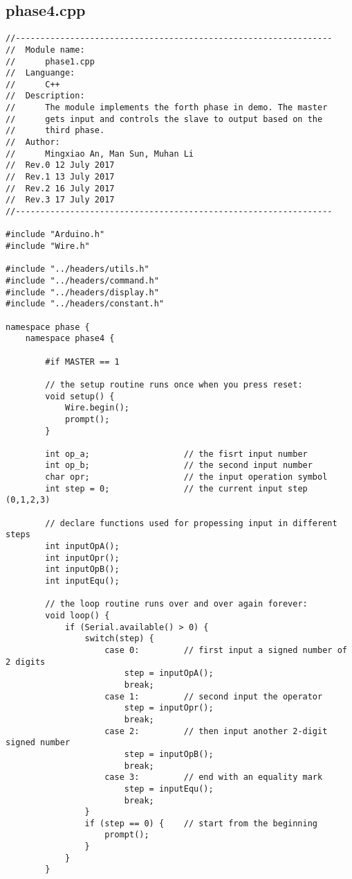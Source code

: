 \subsection{phase4.cpp}
\begin{verbatim}
//----------------------------------------------------------------
//  Module name:
//      phase1.cpp
//  Languange:
//      C++
//  Description:
//      The module implements the forth phase in demo. The master
//      gets input and controls the slave to output based on the
//      third phase.
//  Author:
//      Mingxiao An, Man Sun, Muhan Li
//  Rev.0 12 July 2017
//  Rev.1 13 July 2017
//  Rev.2 16 July 2017
//  Rev.3 17 July 2017
//----------------------------------------------------------------

#include "Arduino.h"
#include "Wire.h"

#include "../headers/utils.h"
#include "../headers/command.h"
#include "../headers/display.h"
#include "../headers/constant.h"

namespace phase {   
    namespace phase4 {
    
        #if MASTER == 1

        // the setup routine runs once when you press reset:
        void setup() {
            Wire.begin();
            prompt();
        }

        int op_a;                   // the fisrt input number
        int op_b;                   // the second input number
        char opr;                   // the input operation symbol
        int step = 0;               // the current input step (0,1,2,3)

        // declare functions used for propessing input in different steps
        int inputOpA();
        int inputOpr();
        int inputOpB();
        int inputEqu();

        // the loop routine runs over and over again forever:
        void loop() {
            if (Serial.available() > 0) {
                switch(step) {      
                    case 0:         // first input a signed number of 2 digits
                        step = inputOpA(); 
                        break;  
                    case 1:         // second input the operator
                        step = inputOpr(); 
                        break;  
                    case 2:         // then input another 2-digit signed number
                        step = inputOpB(); 
                        break;  
                    case 3:         // end with an equality mark
                        step = inputEqu(); 
                        break;  
                }
                if (step == 0) {    // start from the beginning
                    prompt();
                }
            }
        }


\end{verbatim}
